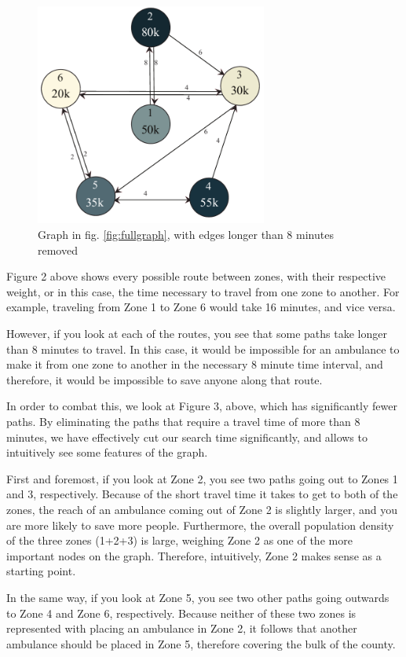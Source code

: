 \documentclass[notitlepage, 12pt]{article}
\begin{document}
\begin{figure}[htbp]
\begin{center}
\includegraphics[width=3in]{greedy6point.pdf}
\caption{Graph in fig. \ref{fig:fullgraph}, with edges longer than 8 minutes removed}
\end{center}
\end{figure}

Figure 2 above shows every possible route between zones, with their respective weight, or in this case, the time necessary to travel from one zone to another. For example, traveling from Zone 1 to Zone 6 would take 16 minutes, and vice versa.

However, if you look at each of the routes, you see that some paths take longer than 8 minutes to travel. In this case, it would be impossible for an ambulance to make it from one zone to another in the necessary 8 minute time interval, and therefore, it would be impossible to save anyone along that route.

In order to combat this, we look at Figure 3, above, which has significantly fewer paths. By eliminating the paths that require a travel time of more than 8 minutes, we have effectively cut our search time significantly, and allows to intuitively see some features of the graph.

First and foremost, if you look at Zone 2, you see two paths going out to Zones 1 and 3, respectively. Because of the short travel time it takes to get to both of the zones, the reach of an ambulance coming out of Zone 2 is slightly larger, and you are more likely to save more people. Furthermore, the overall population density of the three zones (1+2+3) is large, weighing Zone 2 as one of the more important nodes on the graph. Therefore, intuitively, Zone 2 makes sense as a starting point.

In the same way, if you look at Zone 5, you see two other paths going outwards to Zone 4 and Zone 6, respectively. Because neither of these two zones is represented with placing an ambulance in Zone 2, it follows that another ambulance should be placed in Zone 5, therefore covering the bulk of the county.
\end{document}
